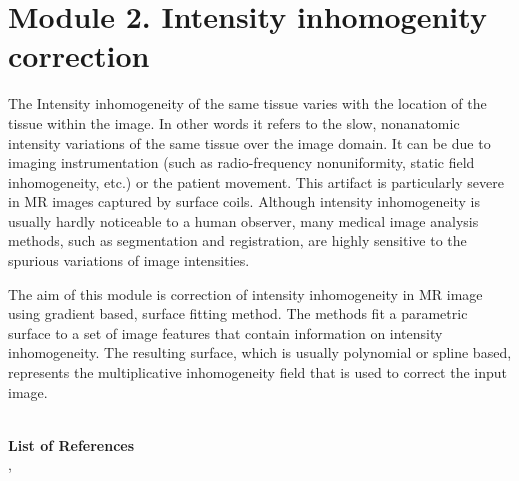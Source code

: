 \section{Module 2. Intensity inhomogenity correction}

The Intensity inhomogeneity of the same tissue varies with the location
of the tissue within the image. In other words it refers to the slow,
nonanatomic intensity variations of the same tissue over the image
domain. It can be due to imaging instrumentation (such as radio-frequency
nonuniformity, static field inhomogeneity, etc.) or the patient movement.
This artifact is particularly severe in MR images captured by surface
coils. Although intensity inhomogeneity is usually hardly noticeable
to a human observer, many medical image analysis methods, such as
segmentation and registration, are highly sensitive to the spurious
variations of image intensities.

The aim of this module is correction of intensity inhomogeneity in
MR image using gradient based, surface fitting method. The methods
fit a parametric surface to a set of image features that contain information
on intensity inhomogeneity. The resulting surface, which is usually
polynomial or spline based, represents the multiplicative inhomogeneity
field that is used to correct the input image.

\hfill{}\\
\textbf{List of References}\\
\cite{2a1}, \cite{2a2}